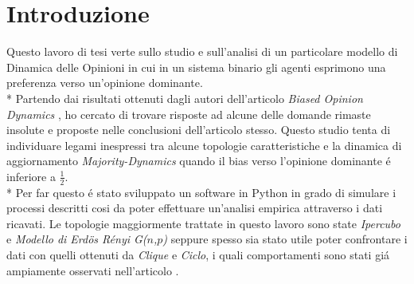 \documentclass[../Tesi.tex]{subfiles}
\begin{document}
\chapter{Introduzione}
Questo lavoro di tesi verte sullo studio e sull'analisi di un particolare modello di Dinamica delle Opinioni in cui in un sistema binario gli agenti esprimono una preferenza verso un'opinione dominante.\\*
Partendo dai risultati ottenuti dagli autori dell'articolo \emph{Biased Opinion Dynamics} \cite{DBLP:journals/corr/abs-2008-13589}, ho cercato di trovare risposte ad alcune delle domande rimaste insolute e proposte nelle conclusioni dell'articolo stesso. Questo studio tenta di individuare legami inespressi tra alcune topologie caratteristiche e la dinamica di aggiornamento \emph{Majority-Dynamics} quando il bias verso l'opinione dominante \'e inferiore a $\frac{1}{2}$.\\*
Per far questo \'e stato sviluppato un software in Python in grado di simulare i processi descritti cosi da poter effettuare un'analisi empirica attraverso i dati ricavati. Le topologie maggiormente trattate in questo lavoro sono state \emph{Ipercubo} e \emph{Modello di Erd{\"o}s R\'enyi G($n$,$p$)}\cite{Erdos:1959:pmd} seppure spesso sia stato utile poter confrontare i dati con quelli ottenuti da \emph{Clique} e \emph{Ciclo}, i quali comportamenti sono stati gi\'a ampiamente osservati nell'articolo \cite{DBLP:journals/corr/abs-2008-13589}. 
\end{document}
